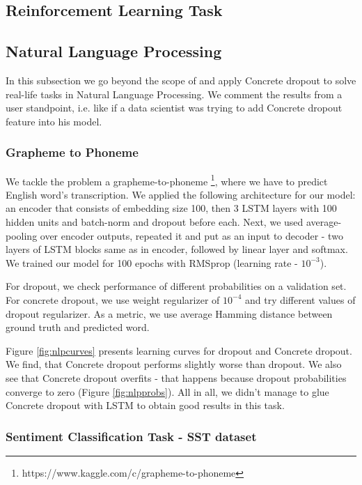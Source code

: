 \documentclass{article}
\begin{document}
\subsection{Reinforcement Learning Task}

\subsection{Natural Language Processing}

In this subsection we go beyond the scope of \cite{concrete} and apply Concrete dropout to solve real-life tasks in Natural Language Processing. We comment the results from a user standpoint, i.e. like if a data scientist was trying to add Concrete dropout feature into his model.

\subsubsection{Grapheme to Phoneme}

We tackle the problem a grapheme-to-phoneme \footnote{https://www.kaggle.com/c/grapheme-to-phoneme}, where we have to predict English word's transcription. We applied the following architecture for our model: an encoder that consists of embedding size 100, then 3 LSTM layers with 100 hidden units and batch-norm and dropout before each. Next, we used average-pooling over encoder outputs, repeated it and put as an input to decoder - two layers of LSTM blocks same as in encoder, followed by linear layer and softmax. We trained our model for 100 epochs with RMSprop (learning rate - $10^{-3}$).

For dropout, we check performance of different probabilities on a validation set. For concrete dropout, we use weight regularizer of $10^{-4}$ and try different values of dropout regularizer. As a metric, we use average Hamming distance between ground truth and predicted word.

Figure \ref{fig:nlpcurves} presents learning curves for dropout and Concrete dropout. We find, that Concrete dropout performs slightly worse than dropout. We also see that Concrete dropout overfits - that happens because dropout probabilities converge to zero (Figure \ref{fig:nlpprobs}). All in all, we didn't manage to glue Concrete dropout with LSTM to obtain good results in this task.

\subsubsection{Sentiment Classification Task - SST dataset }
\end{document}
